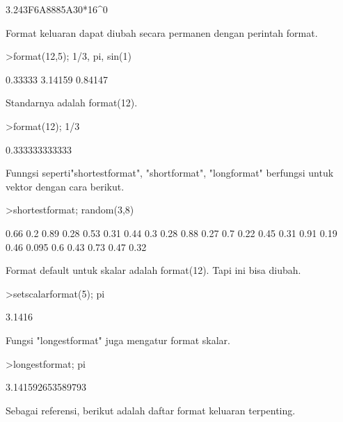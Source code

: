 \documentclass[a4paper,10pt]{article}
\begin{document}
\begin{eulernotebook}
\begin{eulercomment}
\begin{eulercomment}
\begin{eulercomment}
\begin{eulercomment}
\begin{euleroutput}
  3.243F6A8885A30*16^0
\end{euleroutput}
\begin{eulercomment}
Format keluaran dapat diubah secara permanen dengan perintah format.
\end{eulercomment}
\begin{eulerprompt}
>format(12,5); 1/3, pi, sin(1)
\end{eulerprompt}
\begin{euleroutput}
      0.33333 
      3.14159 
      0.84147 
\end{euleroutput}
\begin{eulercomment}
Standarnya adalah format(12).
\end{eulercomment}
\begin{eulerprompt}
>format(12); 1/3
\end{eulerprompt}
\begin{euleroutput}
  0.333333333333
\end{euleroutput}
\begin{eulercomment}
Funngsi seperti"shortestformat", "shortformat", "longformat" berfungsi
untuk vektor dengan cara berikut.
\end{eulercomment}
\begin{eulerprompt}
>shortestformat; random(3,8)
\end{eulerprompt}
\begin{euleroutput}
    0.66    0.2   0.89   0.28   0.53   0.31   0.44    0.3 
    0.28   0.88   0.27    0.7   0.22   0.45   0.31   0.91 
    0.19   0.46  0.095    0.6   0.43   0.73   0.47   0.32 
\end{euleroutput}
\begin{eulercomment}
Format default untuk skalar adalah format(12). Tapi ini bisa diubah.
\end{eulercomment}
\begin{eulerprompt}
>setscalarformat(5); pi
\end{eulerprompt}
\begin{euleroutput}
  3.1416
\end{euleroutput}
\begin{eulercomment}
Fungsi "longestformat" juga mengatur format skalar.
\end{eulercomment}
\begin{eulerprompt}
>longestformat; pi
\end{eulerprompt}
\begin{euleroutput}
  3.141592653589793
\end{euleroutput}
\begin{eulercomment}
Sebagai referensi, berikut adalah daftar format keluaran terpenting.


\end{eulercomment}
\end{eulercomment}
\end{eulercomment}
\end{eulercomment}
\end{eulercomment}
\end{eulernotebook}
\end{document}
